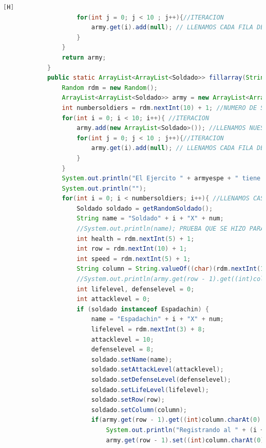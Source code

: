\documentclass{article}
\begin{document}
\begin{lstlisting}[language=java,caption={Las lineas de codigos de la clase Mapa creada:}][H]
					for(int j = 0; j < 10 ; j++){//ITERACION
						army.get(i).add(null); // LLENAMOS CADA FILA DEL ARRAYLIST CON UN OBJETO SOLDADO CON TAL QUE ESTE SEA NULL PARA QUE SEPA QUE ESTE TIENE UNA CASILLA PERO NO HAY NADIE TODAVIA SE PUEDE LLENAR 
					}
				}
				return army;
			}
			public static ArrayList<ArrayList<Soldado>> fillarray(String armyespe, int num){
				Random rdm = new Random();
				ArrayList<ArrayList<Soldado>> army = new ArrayList<ArrayList<Soldado>>();
				int numbersoldiers = rdm.nextInt(10) + 1; //NUMERO DE SOLDADOS ALEATORIOS ENTRE 1 A 10 SOLDADOS 
				for(int i = 0; i < 10; i++){ //ITERACION
					army.add(new ArrayList<Soldado>()); //LLENAMOS NUESTROS ARRAYLIST BIDIMENSIONAL CON CADA FILA PARA QUE CUMPLAN CON ESTRUCTURA DEL TABLERO
					for(int j = 0; j < 10 ; j++){//ITERACION
						army.get(i).add(null); // LLENAMOS CADA FILA DEL ARRAYLIST CON UN OBJETO SOLDADO CON TAL QUE ESTE SEA NULL PARA QUE SEPA QUE ESTE TIENE UNA CASILLA PERO NO HAY NADIE TODAVIA SE PUEDE LLENAR 
					}
				}
				System.out.println("El Ejercito " + armyespe + " tiene " + numbersoldiers + " soldados : " ); 
				System.out.println("");
				for(int i = 0; i < numbersoldiers; i++){ //LLENAMOS CASILLAS CON CADA SOLDADO CREADO ALEATORIAMENTE
					Soldado soldado = getRandomSoldado();
					String name = "Soldado" + i + "X" + num;
					//System.out.println(name); PRUEBA QUE SE HIZO PARA VER LOS NOMBRES
					int health = rdm.nextInt(5) + 1;
					int row = rdm.nextInt(10) + 1;
					int speed = rdm.nextInt(5) + 1;
					String column = String.valueOf((char)(rdm.nextInt(10) + 65)); //REUTILIZAMOS CODIGO DEL ANTERIOR ARCHIVO VIDEOJUEGO2.JAVA YA QUE TENDRIAN LA MISMA FUNCIONALIDAD
					//System.out.println(army.get(row - 1).get((int)column.charAt(0) - 65)); PRUEBA QUE SE HIZO PARA COMPROBAR SI EL OBJETO SE ESTABA DANDO O NO CAPAZ NI EXISTIA  
					int lifelevel, defenselevel = 0;
					int attacklevel = 0;
					if (soldado instanceof Espadachin) {
						name = "Espadachin" + i + "X" + num; 
						lifelevel = rdm.nextInt(3) + 8; 
						attacklevel = 10;
						defenselevel = 8;
						soldado.setName(name);                  
						soldado.setAttackLevel(attacklevel);
						soldado.setDefenseLevel(defenselevel);                    
						soldado.setLifeLevel(lifelevel);
						soldado.setRow(row);
						soldado.setColumn(column);
						if(army.get(row - 1).get((int)column.charAt(0) - 65) == null){
							System.out.println("Registrando al " + (i + 1) + " soldado del Ejercito " + armyespe + "");
							army.get(row - 1).set((int)column.charAt(0) - 65, new Espadachin(name, attacklevel, defenselevel, lifelevel, speed, "Espadachin", true, row, column, attacklevel));

\end{lstlisting}
\end{document}
